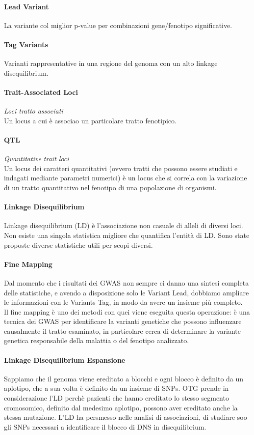 \documentclass{article}
\begin{document}
\paragraph{Lead Variant}La variante col miglior p-value per combinazioni gene/fenotipo significative.
\paragraph{Tag Variants}Varianti rappresentative in una regione del genoma con un alto linkage disequilibrium.
\paragraph{Trait-Associated Loci}\textit{Loci tratto associati}\\Un locus a cui è associao un particolare tratto fenotipico.
\paragraph{QTL}\textit{Quantitative trait loci}\\
    Un locus dei caratteri quantitativi (ovvero tratti che possono essere studiati e indagati mediante parametri numerici) è un locus che si correla con la variazione di un tratto quantitativo nel fenotipo di una popolazione di organismi.
\paragraph{Linkage Disequilibrium} Linkage disequilibrium (LD) è l'associazione non casuale di alleli di diversi loci. Non esiste una singola statistica migliore che quantifica l'entità di LD. Sono state proposte diverse statistiche utili per scopi diversi.
\paragraph{Fine Mapping}Dal momento che i risultati dei GWAS non sempre ci danno una sintesi completa delle statistiche, e avendo a disposizione solo le Variant Lead, dobbiamo ampliare le informazioni con le Variants Tag, in modo da avere un insieme più completo.\\Il fine mapping è uno dei metodi con quei viene eseguita questa operazione: è una tecnica dei GWAS per identificare la varianti genetiche che possono influenzare causalmente il tratto esaminato, in particolare cerca di determinare la variante genetica responsabile della malattia o del fenotipo analizzato.
\paragraph{Linkage Disequilibrium Espansione}
Sappiamo che il genoma viene ereditato a blocchi e ogni blocco è definito da un aplotipo, che a sua volta è definito da un insieme di SNPs. OTG prende in considerazione l'LD perchè pazienti che hanno ereditato lo stesso segmento cromosomico, definito dal medesimo aplotipo, possono aver ereditato anche la stessa mutazione. L'LD ha persmesso nelle analisi di associazioni, di studiare soo gli SNPs necessari a identificare il blocco di DNS in disequilibrium. 
\end{document}
